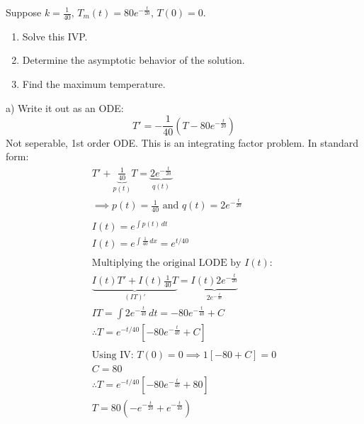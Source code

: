 \documentclass[../main.tex]{subfiles}
\begin{document}
\begin{example}[]
    Suppose \( k=\frac{1}{40},\, T_m(t)=80e^{-\frac{t}{20}},\,T(0)=0 \).
    \begin{enumerate}[label=\alph*), nolistsep]
        \item Solve this IVP.
        \item Determine the asymptotic behavior of the solution.
        \item Find the maximum temperature.
    \end{enumerate}
    a) Write it out as an ODE: \[ T'=-\frac{1}{40}(T-80e^{-\frac{t}{20}}) \]
    Not seperable, 1st order ODE. This is an integrating factor problem.
    In standard form:
    \begin{gather*}
        T' + \underbrace{\frac{1}{40}}_{p(t)} T = \underbrace{2e^{-\frac{t}{20}}}_{q(t)} \\
        \implies p(t) = \frac{1}{40} \text{ and } q(t) = 2e^{-\frac{t}{20}} \\
        \\
        I(t) = e^{\int p(t) \,dt} \\
        I(t) = e^{\int \frac{1}{40} \,dx} = e^{t/40} \\
        \\
        \text{Multiplying the original LODE by } I(t) \text{:}\\
        \underbrace{I(t)T' + I(t)\frac{1}{40}T}_{(IT)'} = \underbrace{I(t)2e^{-\frac{t}{20}}}_{2e^{-\frac{t}{40}}} \\
        IT=\int 2e^{-\frac{t}{40}} \,dt = -80e^{-\frac{t}{40}}+C \\
        \therefore T = e^{-t/40} \left[-80e^{-\frac{t}{40}}+C \right] \\
        \\
        \text{Using IV: } T(0)=0 \implies 1[-80+C]=0 \\
        C=80 \\
        \therefore T = e^{-t/40} \left[ -80e^{-\frac{t}{40}}+80 \right] \\
        \boxed{T=80\left(-e^{-\frac{t}{20}}+e^{-\frac{t}{40}}\right)}
    \end{gather*}


\end{example}
\end{document}
